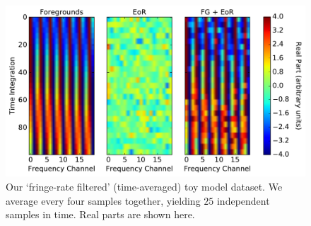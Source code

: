 \documentclass[preprint2,numberedappendix,tighten]{aastex6}  %
\newcommand{\acl}[1]{{\color{red} \textbf{[ACL:  #1]}}}
\begin{document}

\begin{figure}
	\centering
	\includegraphics[width=\columnwidth]{plots/toy_sigloss5.pdf}
	\caption{Our `fringe-rate filtered' (time-averaged) toy model dataset. We average every four samples together, 
yielding $25$ independent samples in time. Real parts are shown here.}
	\label{fig:toy_sigloss5}
\end{figure}

\end{document}
